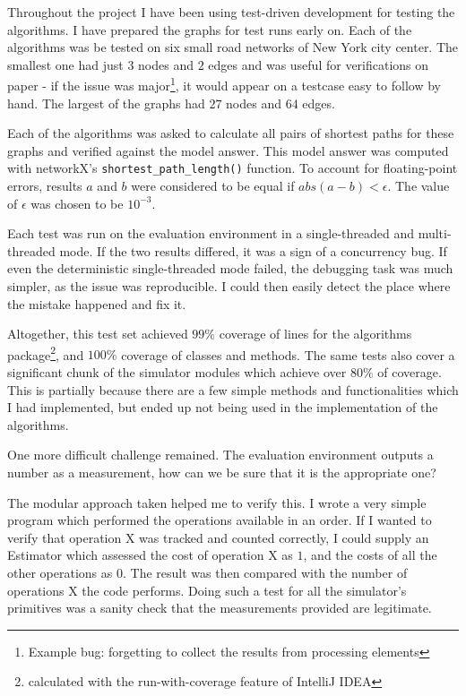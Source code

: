 \documentclass[12pt,a4paper,twoside,openright]{report}
\begin{document}
Throughout the project I have been using test-driven development for testing the algorithms. I have prepared the graphs for test runs early on. Each of the algorithms was be tested on six small road networks of New York city center. The smallest one had just $3$ nodes and $2$ edges and was useful for verifications on paper - if the issue was major\footnote{Example bug: forgetting to collect the results from processing elements}, it would appear on a testcase easy to follow by hand. The largest of the graphs had $27$ nodes and $64$ edges.

Each of the algorithms was asked to calculate all pairs of shortest paths for these graphs and verified against the model answer. This model answer was computed with networkX's \texttt{shortest\_path\_length()} function. To account for floating-point errors, results $a$ and $b$ were considered to be equal if $abs(a-b) < \epsilon$. The value of $\epsilon$ was chosen to be $10^{-3}$.

Each test was run on the evaluation environment in a single-threaded and multi-threaded mode. If the two results differed, it was a sign of a concurrency bug. If even the deterministic single-threaded mode failed, the debugging task was much simpler, as the issue was reproducible. I could then easily detect the place where the mistake happened and fix it.

Altogether, this test set achieved $99\%$ coverage of lines for the algorithms package\footnote{calculated with the run-with-coverage feature of IntelliJ IDEA}, and $100\%$ coverage of classes and methods. The same tests also cover a significant chunk of the simulator modules which achieve over $80\%$ of coverage. This is partially because there are a few simple methods and functionalities which I had implemented, but ended up not being used in the implementation of the algorithms.

One more difficult challenge remained. The evaluation environment outputs a number as a measurement, how can we be sure that it is the appropriate one? 

The modular approach taken helped me to verify this. I wrote a very simple program which performed the operations available in an order. If I wanted to verify that operation X was tracked and counted correctly, I could supply an Estimator which assessed the cost of operation X as $1$, and the costs of all the other operations as $0$. The result was then compared with the number of operations X the code performs. Doing such a test for all the simulator's primitives was a sanity check that the measurements provided are legitimate.
\end{document}
